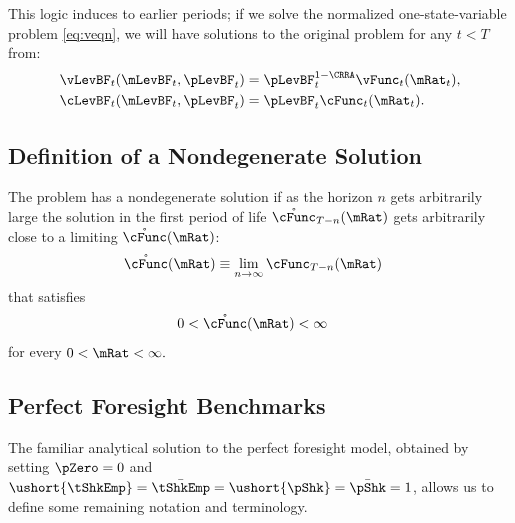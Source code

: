 \documentclass[BufferStockTheory]{subfiles}
\begin{document}
This logic induces to earlier periods; if we solve the
normalized one-state-variable problem \eqref{eq:veqn}, we
will have solutions to the original problem for any $t<T$
from:
\begin{align*}
  \vLevBF_{t}(\mLevBF_{t},\pLevBF_{t})  & = \pLevBF_{t}^{1-\CRRA}\vFunc_{t}(\mRat_{t}),
  \\ \cLevBF_{t}(\mLevBF_{t},\pLevBF_{t})  & = \pLevBF_{t}\cFunc_{t}(\mRat_{t}).
\end{align*}

\hypertarget{Definition-of-a-Nondegenerate-Solution}{}
\subsection{Definition of a Nondegenerate Solution}

The problem has a nondegenerate solution if as the horizon $n$ gets arbitrarily large the solution in the first period of life $\mathring{\cFunc}_{T-n}(\mRat)$ gets arbitrarily close to a limiting $\mathring{\cFunc}(\mRat)$:
\begin{align}
  \mathring{\cFunc}(\mRat)  & \equiv  \lim_{n \rightarrow \infty} \cFunc_{T-n}(\mRat)
\end{align}
that satisfies
\begin{align}
  0 & < \mathring{\cFunc}(\mRat) <  \infty 
\end{align}
for every $0 < \mRat < \infty.$%

\hypertarget{Perfect-Foresight-Benchmarks}{}
\subsection{Perfect Foresight Benchmarks}

The familiar analytical solution to the perfect foresight model, obtained by setting $\pZero=0$ and $\ushort{\tShkEmp}=\bar{\tShkEmp}=\ushort{\pShk}=\bar{\pShk}=1$, allows us to define some remaining notation and terminology.

\hypertarget{Human-Wealth}{}
\end{document}
